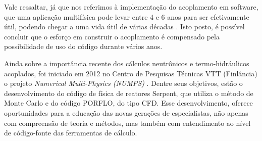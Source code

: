Vale ressaltar, já que nos referimos à implementação do acoplamento em software, que uma aplicação multifísica 
pode levar entre 4 e 6 anos para ser efetivamente útil, podendo chegar a uma vida útil de várias décadas 
\cite{Graham2004}. Isto posto, é possível concluir que o esforço em construir o acoplamento é compensado 
pela possibilidade de uso do código durante vários anos.

Ainda sobre a importância recente dos cálculos neutrônicos e termo-hidráulicos acoplados, foi iniciado em 2012
no Centro de Pesquisas Técnicas VTT (Finlância) o projeto \textit{Numerical Multi-Physics (NUMPS)} \cite{Leppanen2015}.
Dentre seus objetivos, estão o desenvolvimento do código de física de reatores Serpent, que utiliza o método de
Monte Carlo e do código PORFLO, do tipo CFD. Esse desenvolvimento, oferece oportunidades para a educação das novas
gerações de especialistas, não apenas com compreensão de teoria e métodos, mas também com entendimento ao nível de
código-fonte das ferramentas de cálculo.

